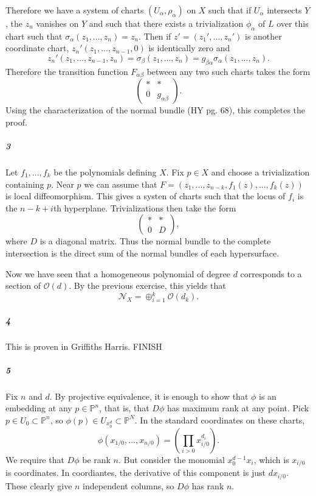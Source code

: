 \documentclass[10pt,letter]{article}
\begin{document}
  Therefore we have a system of charts $(U_{\alpha},\rho_{\alpha})$ on $X$ such that if $U_{\alpha}$ intersects $Y$, the $z_n$ vanishes on $Y$ and such that there exists a trivialization $\phi_{\alpha}$ of $L$ over this chart such that $\sigma_{\alpha}(z_1,...,z_n) = z_n$. Then if $z' = (z_1',...,z_n')$ is another coordinate chart, $z_n'(z_1,...,z_{n-1},0)$ is identically zero and \[z_n'(z_1,...,z_{n-1},z_n) = \sigma_{\beta}(z_1,...,z_n) = g_{\beta \alpha} \sigma_{\alpha}(z_1,...,z_n).\] Therefore the transition function $F_{\alpha \beta}$ between any two such charts takes the form
  \[ \left( \begin{array}{cc} \ast & \ast \\ 0 & g_{\alpha \beta } \end{array} \right).\]
  Using the characterization of the normal bundle (HY pg. 68), this completes the proof. 
\subparagraph{3} Let $f_1,...,f_k$ be the polynomials defining $X$. Fix $p \in X$ and choose a trivialization containing $p$. Near $p$ we can assume that $F = (z_1,...,z_{n-k},f_1(z),...,f_k(z))$ is local diffeomorphism. This gives a systen of charts such that the locus of $f_i$ is the $n-k+i$th hyperplane. Trivializations then take the form 
\[ \left( \begin{array}{cc} \ast & \ast \\ 0 & D \end{array} \right),\]
where $D$ is a diagonal matrix. Thus the normal bundle to the complete intersection is the direct sum of the normal bundles of each hypersurface.

Now we have seen that a homogeneous polynomial of degree $d$ corresponds to a section of $\mathcal{O}(d)$. By the previous exercise, this yields that
\[ \mathcal{N}_X = \oplus_{i=1}^k \mathcal{O}(d_k).\]

\subparagraph{4} This is proven in Griffiths Harris. FINISH

\subparagraph{5} Fix $n$ and $d$. By projective equivalence, it is enough to show that $\phi$ is an embedding at any $p \in \mathbb{P}^n$, that is, that $D\phi$ has maximum rank at any point. Pick $p \in U_0 \subset \mathbb{P}^n$, so $\phi(p) \in U_{x_0^d} \subset \mathbb{P}^N$.  In the standard coordinates on these charts, 
\[ \phi(x_{1/0},...,x_{n/0}) = (\prod \limits_{i > 0} x_{i/0}^{d_i}).\]
We require that $D\phi$ be rank $n$. But consider the monomial $x_0^{d-1} x_i$, which is $x_{i/0}$ is coordinates. In coordiantes, the derivative of this component is just $dx_{i/0}$. These clearly give $n$ independent columns, so $D\phi$ has rank $n$. 
\end{document}
